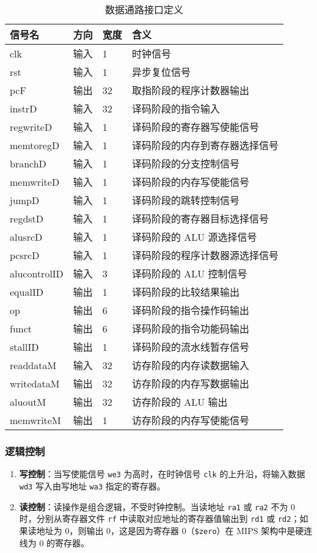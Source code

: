 \begin{table}[htp]
	\caption{数据通路接口定义}\label{tab:Datapathdef}
	\begin{center}
		\begin{tabular}{|l|l|l|p{8cm}|}
		\hline
		\textbf{信号名} & \textbf{方向} & \textbf{宽度} & \textbf{含义}\\ \hline \hline
		clk        & 输入  & 1  & 时钟信号 \\ 
		rst        & 输入  & 1  & 异步复位信号 \\ 
		pcF        & 输出  & 32 & 取指阶段的程序计数器输出 \\ 
		instrD     & 输入  & 32 & 译码阶段的指令输入 \\ 
		regwriteD  & 输入  & 1  & 译码阶段的寄存器写使能信号 \\ 
		memtoregD  & 输入  & 1  & 译码阶段的内存到寄存器选择信号 \\ 
		branchD    & 输入  & 1  & 译码阶段的分支控制信号 \\ 
		memwriteD  & 输入  & 1  & 译码阶段的内存写使能信号 \\ 
		jumpD      & 输入  & 1  & 译码阶段的跳转控制信号 \\ 
		regdstD    & 输入  & 1  & 译码阶段的寄存器目标选择信号 \\ 
		alusrcD    & 输入  & 1  & 译码阶段的 ALU 源选择信号 \\ 
		pcsrcD      & 输入  & 1  & 译码阶段的程序计数器源选择信号 \\ 
		alucontrolID & 输入  & 3  & 译码阶段的 ALU 控制信号 \\ 
		equalID     & 输出  & 1  & 译码阶段的比较结果输出 \\ 
		op          & 输出  & 6  & 译码阶段的指令操作码输出 \\ 
		funct       & 输出  & 6  & 译码阶段的指令功能码输出 \\ 
		stallID     & 输出  & 1  & 译码阶段的流水线暂存信号 \\ 
		readdataM   & 输入  & 32 & 访存阶段的内存读数据输入 \\ 
		writedataM  & 输出  & 32 & 访存阶段的内存写数据输出 \\ 
		aluoutM     & 输出  & 32 & 访存阶段的 ALU 输出 \\ 
		memwriteM   & 输出  & 1  & 访存阶段的内存写使能信号 \\ 
		\hline
		\end{tabular}
	\end{center}
	\end{table}
\subsubsection{逻辑控制}
\begin{enumerate}
	\item \textbf{写控制}：当写使能信号 \texttt{we3} 为高时，在时钟信号 \texttt{clk} 的上升沿，将输入数据 \texttt{wd3} 写入由写地址 \texttt{wa3} 指定的寄存器。
	\item \textbf{读控制}：读操作是组合逻辑，不受时钟控制。当读地址 \texttt{ra1} 或 \texttt{ra2} 不为 0 时，分别从寄存器文件 \texttt{rf} 中读取对应地址的寄存器值输出到 \texttt{rd1} 或 \texttt{rd2}；如果读地址为 0，则输出 0，这是因为寄存器 0（\texttt{\$zero}）在 MIPS 架构中是硬连线为 0 的寄存器。
\end{enumerate}
